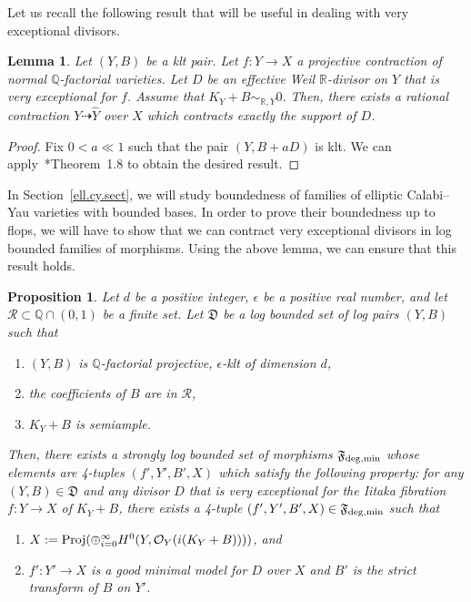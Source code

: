 \documentclass[11pt]{ip-journal}
\newtheorem{lemma}[theorem]{Lemma}
\newtheorem{proposition}[theorem]{Proposition}
\theoremstyle{definition}
\begin{document}
Let us recall the following result that will be useful in dealing with very exceptional divisors.

\begin{lemma}
\label{deg.div.cy.lem}
Let 
$(Y, B)$ 
be a klt pair.
Let 
$f \colon Y \to X$ 
a projective contraction of normal 
$\mathbb{Q}$-factorial 
varieties.
Let 
$D$ 
be an effective Weil 
$\mathbb{R}$-divisor 
on 
$Y$ 
that is very exceptional for
$f$.
Assume that 
$K_Y + B \sim_{\mathbb R, Y} 0$.
Then, there exists a rational contraction $Y \dashrightarrow \hat Y$ over $X$ which contracts exactly the support of $D$.
\end{lemma}

\begin{proof}
Fix 
$0<a\ll 1$ 
such that the pair 
$(Y, B +aD)$ 
is klt. 
We can apply~\cite{MR2929730}*{Theorem~1.8} to obtain the desired result. 
\end{proof}

In Section~\ref{ell.cy.sect}, we will study boundedness of families of elliptic Calabi--Yau varieties with bounded bases.
In order to prove their boundedness up to flops, we will have to show that we can contract very exceptional divisors in log bounded families of morphisms.
Using the above lemma, we can ensure that this result holds.

\begin{proposition}
\label{MMP.deg.bound.prop}
Let 
$d$ 
be a positive integer, 
$\epsilon$ 
be a positive real number, and let 
$\mathcal R \subset \mathbb{Q} \cap (0,1)$ 
be a finite set.
\newline
Let 
$\mathfrak D$
be a log bounded set of log pairs 
$(Y, B)$ 
such that
\begin{enumerate}
    \item 
$(Y, B)$ 
is 
$\mathbb{Q}$-factorial 
projective, 
$\epsilon$-klt 
of dimension 
$d$,
    
    \item
the coefficients of 
$B$ 
are in 
$\mathcal{R}$,

    \item 
$K_Y+B$ 
is semiample.
\end{enumerate}
\noindent
Then, there exists a strongly log bounded set of morphisms 
$\mathfrak{F}_{{\rm deg, min}}$ 
whose elements are 4-tuples 
$(f', Y', B', X)$ 
which satisfy the following property:
\newline
for any 
$(Y, B) \in \mathfrak D$ 
and any divisor 
$D$ 
that is very exceptional for the Iitaka fibration 
$f \colon Y \to X$ 
of 
$K_Y+B$,
there exists a 4-tuple
$(f', Y', B', X) \in \mathfrak{F}_{{\rm deg, min}}$ 
such that
\begin{enumerate}
    \item[(i)] 
$X:= {\rm Proj}(\oplus_{i=0}^\infty H^0(Y, \mathcal{O}_Y(i(K_Y+B))))$, and


    \item[(ii)]
$f' \colon Y' \to X$ is a good minimal model for $D$ over $X$ and $B'$ is the strict transform of $B$ on $Y'$.
\end{enumerate}
\end{proposition}
\end{document}
